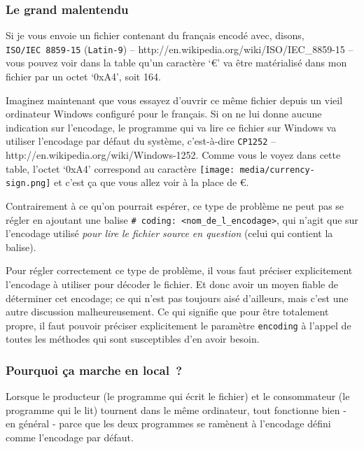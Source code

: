     \hypertarget{le-grand-malentendu}{%
\subsubsection{Le grand malentendu}\label{le-grand-malentendu}}

    Si je vous envoie un fichier contenant du français encodé avec, disons,
\texttt{ISO/IEC\ 8859-15} (\texttt{Latin-9}) --
http://en.wikipedia.org/wiki/ISO/IEC\_8859-15 -- vous pouvez voir dans
la table qu'un caractère `€' va être matérialisé dans mon fichier par un
octet `0xA4', soit 164.

Imaginez maintenant que vous essayez d'ouvrir ce même fichier depuis un
vieil ordinateur Windows configuré pour le français. Si on ne lui donne
aucune indication sur l'encodage, le programme qui va lire ce fichier
sur Windows va utiliser l'encodage par défaut du système, c'est-à-dire
\texttt{CP1252} -- http://en.wikipedia.org/wiki/Windows-1252. Comme vous
le voyez dans cette table, l'octet `0xA4' correspond au caractère
\texttt{[image: media/currency-sign.png]} et c'est ça que vous allez
voir à la place de €.

Contrairement à ce qu'on pourrait espérer, ce type de problème ne peut
pas se régler en ajoutant une balise
\texttt{\#\ coding:\ \textless{}nom\_de\_l\_encodage\textgreater{}}, qui
n'agit que sur l'encodage utilisé \emph{pour lire le fichier source en
question} (celui qui contient la balise).

Pour régler correctement ce type de problème, il vous faut préciser
explicitement l'encodage à utiliser pour décoder le fichier. Et donc
avoir un moyen fiable de déterminer cet encodage; ce qui n'est pas
toujours aisé d'ailleurs, mais c'est une autre discussion
malheureusement. Ce qui signifie que pour être totalement propre, il
faut pouvoir préciser explicitement le paramètre \texttt{encoding} à
l'appel de toutes les méthodes qui sont susceptibles d'en avoir besoin.

    \hypertarget{pourquoi-uxe7a-marche-en-local}{%
\subsubsection{Pourquoi ça marche en
local~?}\label{pourquoi-uxe7a-marche-en-local}}

    Lorsque le producteur (le programme qui écrit le fichier) et le
consommateur (le programme qui le lit) tournent dans le même ordinateur,
tout fonctionne bien - en général - parce que les deux programmes se
ramènent à l'encodage défini comme l'encodage par défaut.

